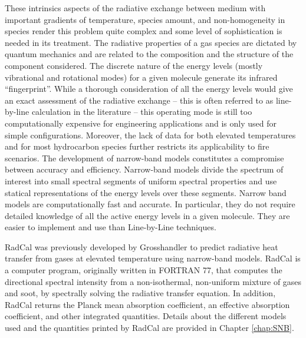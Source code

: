 These intrinsics aspects of the radiative exchange between medium with important gradients of temperature, species amount, and non-homogeneity in species render this problem quite complex and some level of sophistication is needed in its treatment. The radiative properties of a gas species are dictated by quantum mechanics and are related to the composition and the structure of the component considered. The discrete nature of the energy levels (mostly vibrational and rotational modes) for a given molecule generate its infrared ``fingerprint''. While a thorough consideration of all the energy levels would give an exact assessment of the radiative exchange -- this is often referred to as line-by-line calculation in the literature -- this operating mode is still too computationally expensive for engineering applications and is only used for simple configurations. Moreover, the lack of data for both elevated temperatures and for most hydrocarbon species further restricts its applicability to fire scenarios. The development of narrow-band models constitutes a compromise between accuracy and efficiency. Narrow-band models divide the spectrum of interest into small spectral segments of uniform spectral properties and use statical representations of the energy levels over these segments. Narrow band models are computationally fast and accurate. In particular, they do not require detailed knowledge of all the active energy levels in a given molecule. They are easier to implement and use than Line-by-Line techniques.

RadCal was previously developed by Grosshandler \cite{Grosshandler1993} to predict radiative heat transfer from gases at elevated temperature using narrow-band models. RadCal is a computer program, originally written in FORTRAN 77, that computes the directional spectral intensity from a non-isothermal, non-uniform mixture of gases and soot, by spectrally solving the radiative transfer equation. In addition, RadCal returns the Planck mean absorption coefficient, an effective absorption coefficient, and other integrated quantities. Details about the different models used and the quantities printed by RadCal are provided in Chapter \ref{chap:SNB}.

